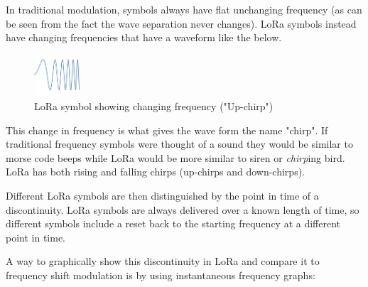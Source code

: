 In traditional modulation, symbols always have flat unchanging frequency (as can
be seen from the fact the wave separation never changes). LoRa symbols instead
have changing frequencies that have a waveform like the below.

\begin{figure}[H]
    \centering
    \includegraphics[width=0.15\textwidth]{contents/part-1/fig1/lorawavelength.png}
    \caption{LoRa symbol showing changing frequency ("Up-chirp")}
    \label{fig:lora-wave}
\end{figure}

This change in frequency is what gives the wave form the name "chirp". If
traditional frequency symbols were thought of a sound they would be similar to
morse code beeps while LoRa would be more similar to siren or \textit{chirp}ing
bird. LoRa has both rising and falling chirps (up-chirps and down-chirps).

Different LoRa symbols are then distinguished by the point in time of a
discontinuity. LoRa symbols are always delivered over a known length of time, so
different symbols include a reset back to the starting frequency at a different
point in time.

A way to graphically show this discontinuity in LoRa and compare it to frequency
shift modulation is by using instantaneous frequency graphs:

